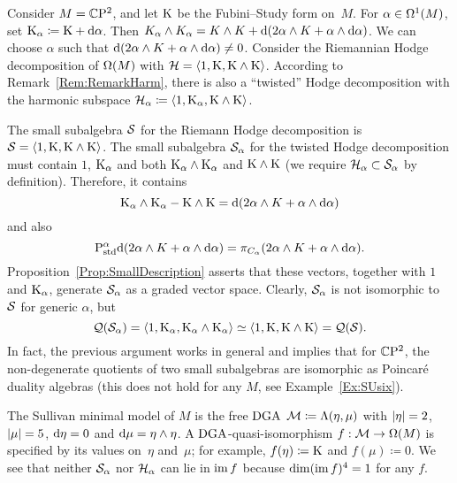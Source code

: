 \documentclass[\MainFolder/Text.tex]{subfiles}
\begin{document}
\begin{Example}\label{Ex:NonUniqueSmall}
Consider $M=\mathbb{C}\mathrm{P}^2$, and let $\mathrm{K}$ be the Fubini--Study form on~$M$.
For $\alpha\in\Omega^1(M)$, set $\mathrm{K}_\alpha \coloneqq \mathrm{K} + \mathrm{d}\alpha$.
Then $K_\alpha \wedge K_\alpha = K \wedge K + \mathrm{d}(2\alpha\wedge K + \alpha \wedge \mathrm{d}\alpha)$.
We can choose $\alpha$ such that $\mathrm{d}(2\alpha\wedge K + \alpha\wedge\mathrm{d}\alpha)\neq 0$.
Consider the Riemannian Hodge decomposition of $\Omega(M)$ with $\mathcal{H} = \langle 1, \mathrm{K}, \mathrm{K}\wedge \mathrm{K}\rangle$.
According to Remark~\ref{Rem:RemarkHarm}, there is also a ``twisted'' Hodge decomposition with the harmonic subspace $\mathcal{H}_\alpha \coloneqq \langle 1, \mathrm{K}_\alpha, \mathrm{K} \wedge \mathrm{K}\rangle$.

The small subalgebra $\mathcal{S}$ for the Riemann Hodge decomposition is $\mathcal{S}=\langle 1, \mathrm{K}, \mathrm{K}\wedge\mathrm{K}\rangle$.
The small subalgebra $\mathcal{S}_\alpha$ for the twisted Hodge decomposition must contain $1$, $\mathrm{K}_\alpha$ and both $\mathrm{K}_\alpha\wedge\mathrm{K}_\alpha$ and $\mathrm{K}\wedge\mathrm{K}$ (we require $\mathcal{H}_\alpha\subset\mathcal{S}_\alpha$ by definition).
Therefore, it contains 
\[
\mathrm{K}_\alpha \wedge \mathrm{K}_\alpha - \mathrm{K}\wedge\mathrm{K} = \mathrm{d}(2\alpha\wedge K + \alpha\wedge\mathrm{d}\alpha)
\]
and also
\[
\mathrm{P}_{\mathrm{std}}^\alpha\mathrm{d}(2\alpha\wedge K + \alpha\wedge\mathrm{d}\alpha)=\pi_{C_\alpha}(2\alpha\wedge K + \alpha\wedge\mathrm{d}\alpha).
\]
Proposition~\ref{Prop:SmallDescription} asserts that these vectors, together with $1$ and $\mathrm{K}_\alpha$, generate $\mathcal{S}_\alpha$ as a graded vector space.
Clearly, $\mathcal{S}_\alpha$ is not isomorphic to $\mathcal{S}$ for generic $\alpha$, but 
\[
\mathcal{Q}(\mathcal{S}_\alpha)=\langle1,\mathrm{K}_\alpha,\mathrm{K}_\alpha\wedge\mathrm{K}_\alpha\rangle\simeq \langle 1, \mathrm{K}, \mathrm{K}\wedge\mathrm{K}\rangle= \mathcal{Q}(\mathcal{S}).
\]
In fact, the previous argument works in general and implies that for $\mathbb{C}\mathrm{P}^2$, the non-degenerate quotients of two small subalgebras are isomorphic as Poincar\'e duality algebras (this does not hold for any $M$, see Example~\ref{Ex:SUsix}).

The Sullivan minimal model of $M$ is the free $\mathrm{DGA}$ $\mathcal{M} \coloneqq \Lambda(\eta,\mu)$ with $|\eta|=2$, $|\mu|=5$, $\mathrm{d}\eta = 0$ and $\mathrm{d}\mu=\eta\wedge\eta$.
A $\mathrm{DGA}$-quasi-isomorphism $f: \mathcal{M}\rightarrow\Omega(M)$ is specified by its values on~$\eta$ and~$\mu$; for example, $f(\eta)\coloneqq\mathrm{K}$ and $f(\mu)\coloneqq 0$.
We see that neither $\mathcal{S}_\alpha$ nor $\mathcal{H}_\alpha$ can lie in $\operatorname{im} f$ because $\dim (\operatorname{im} f)^{4}=1$ for any $f$.
\end{Example}
\end{document}

